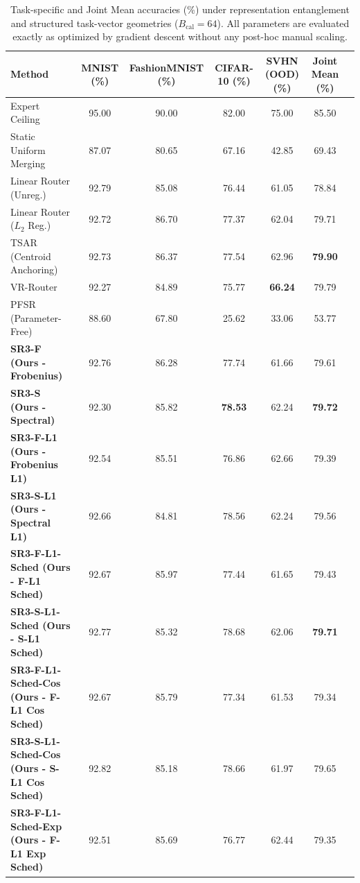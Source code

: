 \begin{table}[t]
\caption{Task-specific and Joint Mean accuracies (\%) under representation entanglement and structured task-vector geometries ($B_{\text{cal}}=64$). All parameters are evaluated exactly as optimized by gradient descent without any post-hoc manual scaling.}
\label{tab:results}
\vskip 0.15in
\begin{center}
\begin{small}
\begin{sc}
\begin{tabular}{lcccccr}
\toprule
Method & MNIST (\%) & FashionMNIST (\%) & CIFAR-10 (\%) & SVHN (OOD) (\%) & Joint Mean (\%) \\
\midrule
Expert Ceiling           & 95.00 & 90.00 & 82.00 & 75.00 & 85.50 \\
Static Uniform Merging   & 87.07 & 80.65 & 67.16 & 42.85 & 69.43 \\
Linear Router (Unreg.)   & 92.79 & 85.08 & 76.44 & 61.05 & 78.84 \\
Linear Router ($L_2$ Reg.) & 92.72 & 86.70 & 77.37 & 62.04 & 79.71 \\
TSAR (Centroid Anchoring)& 92.73 & 86.37 & 77.54 & 62.96 & \textbf{79.90} \\
VR-Router                & 92.27 & 84.89 & 75.77 & \textbf{66.24} & 79.79 \\
PFSR (Parameter-Free)    & 88.60 & 67.80 & 25.62 & 33.06 & 53.77 \\
\midrule
\textbf{SR3-F (Ours - Frobenius)} & 92.76 & 86.28 & 77.74 & 61.66 & 79.61 \\
\textbf{SR3-S (Ours - Spectral)}  & 92.30 & 85.82 & \textbf{78.53} & 62.24 & \textbf{79.72} \\
\textbf{SR3-F-L1 (Ours - Frobenius L1)} & 92.54 & 85.51 & 76.86 & 62.66 & 79.39 \\
\textbf{SR3-S-L1 (Ours - Spectral L1)}  & 92.66 & 84.81 & 78.56 & 62.24 & 79.56 \\
\textbf{SR3-F-L1-Sched (Ours - F-L1 Sched)} & 92.67 & 85.97 & 77.44 & 61.65 & 79.43 \\
\textbf{SR3-S-L1-Sched (Ours - S-L1 Sched)} & 92.77 & 85.32 & 78.68 & 62.06 & \textbf{79.71} \\
\textbf{SR3-F-L1-Sched-Cos (Ours - F-L1 Cos Sched)} & 92.67 & 85.79 & 77.34 & 61.53 & 79.34 \\
\textbf{SR3-S-L1-Sched-Cos (Ours - S-L1 Cos Sched)} & 92.82 & 85.18 & 78.66 & 61.97 & 79.65 \\
\textbf{SR3-F-L1-Sched-Exp (Ours - F-L1 Exp Sched)} & 92.51 & 85.69 & 76.77 & 62.44 & 79.35 \\

\end{tabular}
\end{sc}
\end{small}
\end{center}
\end{table}
